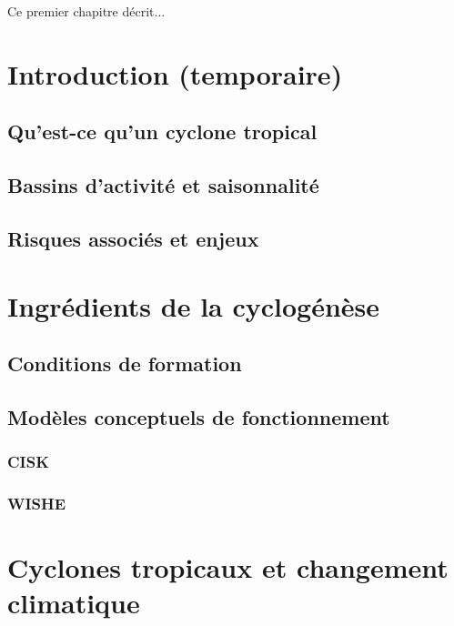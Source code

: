 \documentclass[../main.tex]{subfiles}
\begin{document}
\begin{itshape}
Ce premier chapitre décrit...
\end{itshape}

\minitoc
\section{Introduction (temporaire)}

\subsection{Qu'est-ce qu'un cyclone tropical}

\subsection{Bassins d'activité et saisonnalité}

\subsection{Risques associés et enjeux}

\section{Ingrédients de la cyclogénèse}
  
\subsection{Conditions de formation}

\subsection{Modèles conceptuels de fonctionnement}

\subsubsection{CISK}

\subsubsection{WISHE}

\section{Cyclones tropicaux et changement climatique}
\end{document}
